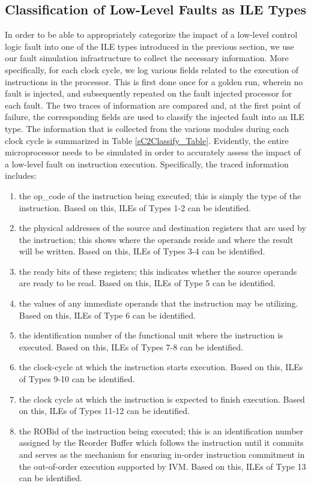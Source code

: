 \documentclass[12pt]{yalephd}
\begin{document}
\subsection{Classification of Low-Level Faults as ILE Types}

In order to be able to appropriately categorize the impact of a low-level control logic fault into one of the ILE types introduced in the previous section, we use our fault simulation infrastructure to collect the necessary information. More specifically, for each clock cycle, we log various fields related to the execution of instructions in the processor. This is first done once for a golden run, wherein no fault is injected, and subsequently repeated on the fault injected processor for each fault. The two traces of information are compared and, at the first point of failure, the corresponding fields are used to classify the injected fault into an ILE type. The information that is collected from the various modules during each clock cycle is summarized in Table \ref{sC2Classify_Table}. Evidently, the entire microprocessor needs to be simulated in order to accurately assess the impact of a low-level fault on instruction execution. Specifically, the traced information includes:
\begin{enumerate}
\item the op\_code of the instruction being executed; this is simply the type of the instruction. Based on this, ILEs of Types 1-2 can be identified.
\item the physical addresses of the source and destination registers that are used by the instruction; this shows where the operands reside and where the result will be written. Based on this, ILEs of Types 3-4 can be identified.
\item the ready bits of these registers; this indicates whether the source operands are ready to be read. Based on this, ILEs of Type 5 can be identified.
\item the values of any immediate operands that the instruction may be utilizing. Based on this, ILEs of Type 6 can be identified.
\item the identification number of the functional unit where the instruction is executed. Based on this, ILEs of Types 7-8 can be identified.
\item the clock-cycle at which the instruction starts execution. Based on this, ILEs of Types 9-10 can be identified.
\item  the clock cycle at which the instruction is expected to finish execution. Based on this, ILEs of Types 11-12 can be identified.
\item the ROBid of the instruction being executed; this is an identification number assigned by the Reorder Buffer which follows the instruction until it commits and serves as the mechanism for ensuring in-order instruction commitment in the out-of-order execution supported by IVM. Based on this, ILEs of Type 13 can be identified.
\end{enumerate}
\end{document}
